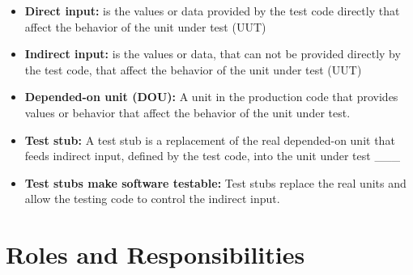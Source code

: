 \documentclass[11pt]{article}
\providecommand{\tightlist}{%
      \setlength{\itemsep}{0pt}\setlength{\parskip}{0pt}}
\begin{document}
\begin{itemize}
\tightlist
\item
  \textbf{Direct input:} is the values or data provided by the test code
  directly that affect the behavior of the unit under test (UUT)
\item
  \textbf{Indirect input:} is the values or data, that can not be
  provided directly by the test code, that affect the behavior of the
  unit under test (UUT)
\item
  \textbf{Depended-on unit (DOU):} A unit in the production code that
  provides values or behavior that affect the behavior of the unit under
  test.
\item
  \textbf{Test stub:} A test stub is a replacement of the real
  depended-on unit that feeds indirect input, defined by the test code,
  into the unit under test \_\_\_
\item
  \textbf{Test stubs make software testable:} Test stubs replace the
  real units and allow the testing code to control the indirect input.
\end{itemize}

    \hypertarget{roles-and-responsibilities}{%
\section{Roles and Responsibilities}\label{roles-and-responsibilities}}
\end{document}
